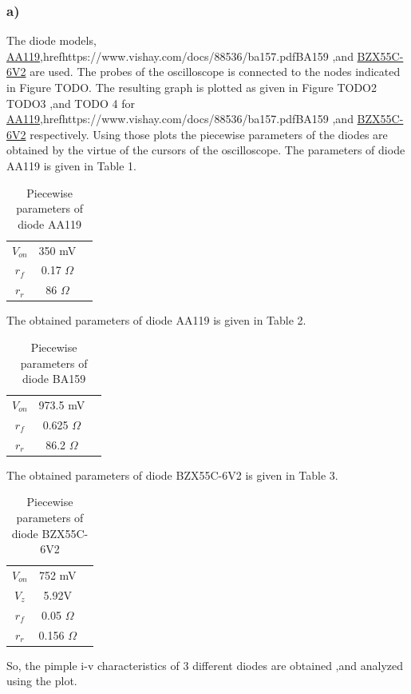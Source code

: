 \documentclass[letterpaper,12pt]{article}
\begin{document}
\subsubsection{a)}
The diode models, \href{https://logosfoundation.org/elektron/mixers/AA119.pdf}{AA119},href{https://www.vishay.com/docs/88536/ba157.pdf}{BA159}  ,and \href{https://www.vishay.com/docs/85604/bzx55.pdf}{BZX55C-6V2} are used. The probes of the oscilloscope is connected to the nodes indicated in Figure TODO. The resulting graph is plotted as given in Figure TODO2 TODO3 ,and TODO 4 for 
\href{https://logosfoundation.org/elektron/mixers/AA119.pdf}{AA119},href{https://www.vishay.com/docs/88536/ba157.pdf}{BA159}  ,and \href{https://www.vishay.com/docs/85604/bzx55.pdf}{BZX55C-6V2} respectively.
Using those plots the piecewise parameters of the diodes are obtained by the virtue of the cursors of the oscilloscope. The parameters of diode AA119 is given in Table 1.

\begin{table}[H]
    \centering
    \caption{Piecewise parameters of diode AA119}
    \begin{tabular}{||c | c | c||}
    \(V_{on}\) & 350 mV \\
    \(r_f\) & 0.17 \(\Omega\) \\
    \(r_r\) & 86 \(\Omega\)
    \end{tabular}
\end{table}
The obtained parameters of diode AA119 is given in Table 2.
\begin{table}[H]
    \centering
    \caption{Piecewise parameters of diode BA159}
    \begin{tabular}{||c | c | c||}
    \(V_{on}\) & 973.5 mV \\
    \(r_f\) & 0.625 \(\Omega\) \\
    \(r_r\) & 86.2 \(\Omega\)
    \end{tabular}
\end{table}
The obtained parameters of diode BZX55C-6V2 is given in Table 3.
\begin{table}[H]
    \centering
    \caption{Piecewise parameters of diode BZX55C-6V2}
    \begin{tabular}{||c | c | c||}
    \(V_{on}\) & 752 mV \\
    \(V_{z}\) & 5.92V \\
    \(r_f\) & 0.05 \(\Omega\) \\
    \(r_r\) & 0.156 \(\Omega\)
    \end{tabular}
\end{table}
So, the pimple i-v characteristics of 3 different diodes are obtained ,and analyzed using the plot.
\end{document}
